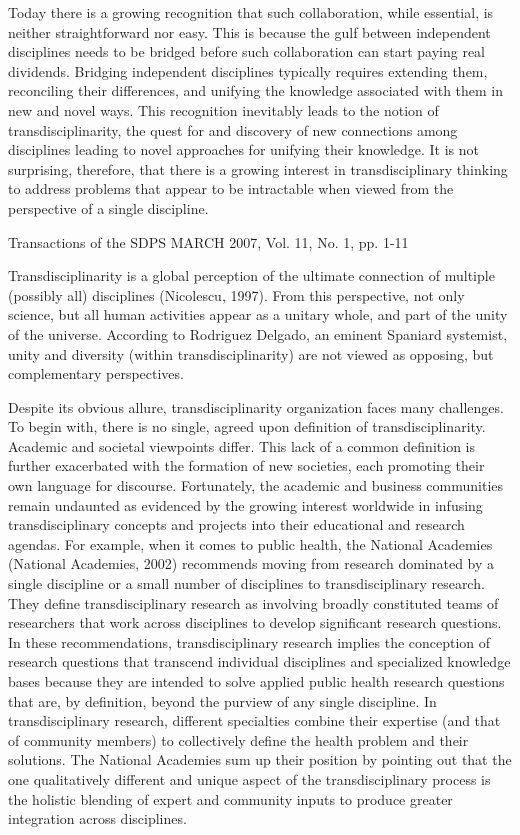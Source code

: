 Today there is a growing recognition that such collaboration, while essential, is neither straightforward nor easy. This is because the gulf between independent disciplines needs to be bridged before such collaboration can start paying real dividends. Bridging independent disciplines typically requires extending them, reconciling their differences, and unifying the knowledge associated with them in new and novel ways. This recognition inevitably leads to the notion of transdisciplinarity, the quest for and discovery of new connections among disciplines leading to novel approaches for unifying their knowledge. It is not surprising, therefore, that there is a growing interest in transdisciplinary thinking to address problems that appear to be intractable when viewed from the perspective of a single discipline. 

Transactions of the SDPS MARCH 2007, Vol. 11, No. 1, pp. 1-11 

Transdisciplinarity is a global perception of the ultimate connection of multiple (possibly all) disciplines (Nicolescu, 1997). From this perspective, not only science, but all human activities appear as a unitary whole, and part of the unity of the universe. According to Rodriguez Delgado, an eminent Spaniard systemist, unity and diversity (within transdisciplinarity) are not viewed as opposing, but complementary perspectives. 

Despite its obvious allure, transdisciplinarity organization faces many challenges. To begin with, there is no single, agreed upon definition of transdisciplinarity. Academic and societal viewpoints differ. This lack of a common definition is further exacerbated with the formation of new societies, each promoting their own language for discourse. Fortunately, the academic and business communities remain undaunted as evidenced by the growing interest worldwide in infusing transdisciplinary concepts and projects into their educational and research agendas. For example, when it comes to public health, the National Academies (National Academies, 2002) recommends moving from research dominated by a single discipline or a small number of disciplines to transdisciplinary research. They define transdisciplinary research as involving broadly constituted teams of researchers that work across disciplines to develop significant research questions. In these recommendations, transdisciplinary research implies the conception of research questions that transcend individual disciplines and specialized knowledge bases because they are intended to solve applied public health research questions that are, by definition, beyond the purview of any single discipline. In transdisciplinary research, different specialties combine their expertise (and that of community members) to collectively define the health problem and their solutions. The National Academies sum up their position by pointing out that the one qualitatively different and unique aspect of the transdisciplinary process is the holistic blending of expert and community inputs to produce greater integration across disciplines. 

